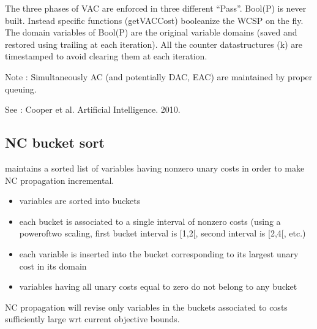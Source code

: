 \documentclass[letterpaper,10pt,openany,oneside,english]{sphinxmanual}
\begin{document}
\begin{fulllineitems}

\pysigstartsignatures
{}
\pysigstopsignatures
\sphinxAtStartPar
The three phases of VAC are enforced in three different “Pass”. Bool(P) is never built. Instead specific functions (getVACCost) booleanize the WCSP on the fly. The domain variables of Bool(P) are the original variable domains (saved and restored using trailing at each iteration). All the counter data\sphinxhyphen{}structures (k) are timestamped to avoid clearing them at each iteration.

\sphinxAtStartPar
Note : Simultaneously AC (and potentially DAC, EAC) are maintained by proper queuing.

\sphinxAtStartPar
See :  Cooper et al. Artificial Intelligence. 2010. 

\end{fulllineitems}



\subsection{NC bucket sort}
\label{\detokenize{ref/ref_modules:nc-bucket-sort}}

\begin{fulllineitems}

\pysigstartsignatures
{}
\pysigstopsignatures
\sphinxAtStartPar
maintains a sorted list of variables having non\sphinxhyphen{}zero unary costs in order to make NC propagation incremental.\begin{itemize}
\item {} 
\sphinxAtStartPar
variables are sorted into buckets

\item {} 
\sphinxAtStartPar
each bucket is associated to a single interval of non\sphinxhyphen{}zero costs (using a power\sphinxhyphen{}of\sphinxhyphen{}two scaling, first bucket interval is {[}1,2{[}, second interval is {[}2,4{[}, etc.)

\item {} 
\sphinxAtStartPar
each variable is inserted into the bucket corresponding to its largest unary cost in its domain

\item {} 
\sphinxAtStartPar
variables having all unary costs equal to zero do not belong to any bucket

\end{itemize}


\sphinxAtStartPar
NC propagation will revise only variables in the buckets associated to costs sufficiently large wrt current objective bounds. 

\end{fulllineitems}
\end{document}
